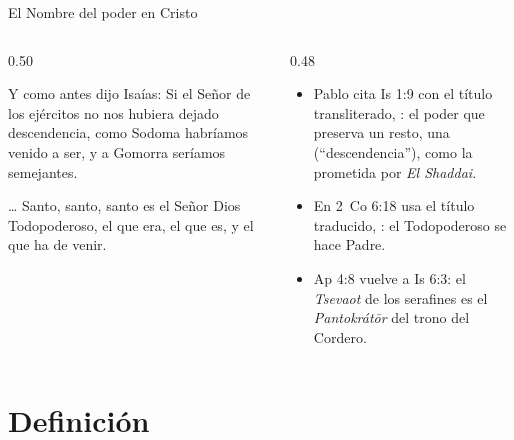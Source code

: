 \begin{frame}{El Nombre del poder en Cristo}
\begin{columns}[t,onlytextwidth]
\begin{column}{0.50\textwidth}
\begin{cita}Y como antes dijo Isaías: Si el Señor de los ejércitos no nos hubiera dejado descendencia, como Sodoma habríamos venido a ser, y a Gomorra seríamos semejantes.\end{cita}
\begin{cita}[fontupper=\scriptsize\itshape]\ldots{} Santo, santo, santo es el Señor Dios Todopoderoso, el que era, el que es, y el que ha de venir.\end{cita}
\end{column}
\begin{column}{0.48\textwidth}\small
\begin{itemize}
\item Pablo cita Is 1:9 con el título transliterado, : el poder que preserva un resto, una  (``descendencia''), como la prometida por \emph{El Shaddai}.
\item En 2~Co 6:18 usa el título traducido, : el Todopoderoso se hace Padre.
\item Ap 4:8 vuelve a Is 6:3: el \emph{Tsevaot} de los serafines es el \emph{Pantokrátōr} del trono del Cordero.
\end{itemize}
\end{column}
\end{columns}
\end{frame}

\section{Definición}

